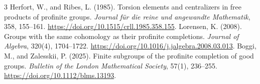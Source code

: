 \documentclass[11pt,a4paper]{article}
\begin{document}

\begin{thebibliography}{3}
Herfort, W., and Ribes, L. (1985).
Torsion elements and centralizers in free products of profinite groups.
\emph{Journal f\"ur die reine und angewandte Mathematik}, 358, 155--161.
\url{https://doi.org/10.1515/crll.1985.358.155}.
Lorensen, K. (2008). Groups with the same cohomology as their profinite completions.
\emph{Journal of Algebra}, 320(4), 1704--1722.
\url{https://doi.org/10.1016/j.jalgebra.2008.03.013}.
Boggi, M., and Zalesskii, P. (2025).
Finite subgroups of the profinite completion of good groups.
\emph{Bulletin of the London Mathematical Society}, 57(1), 236--255.
\url{https://doi.org/10.1112/blms.13193}.
\end{thebibliography}
\end{document}
